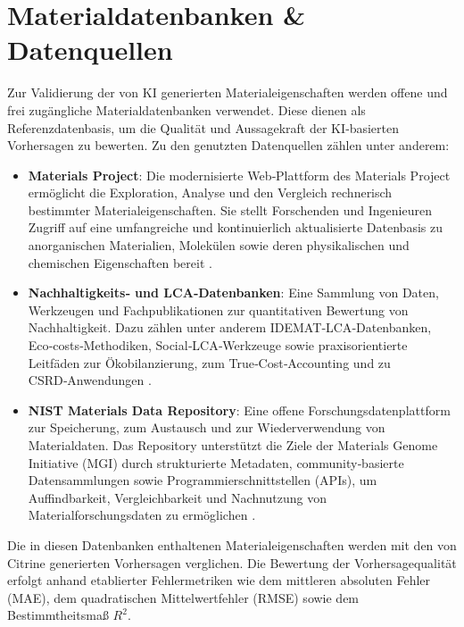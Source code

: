 \section{Materialdatenbanken \& Datenquellen} %

Zur Validierung der von KI generierten Materialeigenschaften werden offene und frei zugängliche Materialdatenbanken verwendet. Diese dienen als Referenzdatenbasis, um die Qualität und Aussagekraft der KI‑basierten Vorhersagen zu bewerten. Zu den genutzten Datenquellen zählen unter anderem:

\begin{itemize}
	\item \textbf{Materials Project}:  
	Die modernisierte Web‑Plattform des Materials Project ermöglicht die Exploration, Analyse und den Vergleich rechnerisch bestimmter Materialeigenschaften. Sie stellt Forschenden und Ingenieuren Zugriff auf eine umfangreiche und kontinuierlich aktualisierte Datenbasis zu anorganischen Materialien, Molekülen sowie deren physikalischen und chemischen Eigenschaften bereit \cite{materials_project_nextgen_2026}.
	
	\item \textbf{Nachhaltigkeits‑ und LCA‑Datenbanken}:  
	Eine Sammlung von Daten, Werkzeugen und Fachpublikationen zur quantitativen Bewertung von Nachhaltigkeit. Dazu zählen unter anderem IDEMAT‑LCA‑Datenbanken, Eco‑costs‑Methodiken, Social‑LCA‑Werkzeuge sowie praxisorientierte Leitfäden zur Ökobilanzierung, zum True‑Cost‑Accounting und zu CSRD‑Anwendungen \cite{ecocostsvalue_data_tools_books_2026}.
	
	\item \textbf{NIST Materials Data Repository}:  
	Eine offene Forschungsdatenplattform zur Speicherung, zum Austausch und zur Wiederverwendung von Materialdaten. Das Repository unterstützt die Ziele der Materials Genome Initiative (MGI) durch strukturierte Metadaten, community‑basierte Datensammlungen sowie Programmierschnittstellen (APIs), um Auffindbarkeit, Vergleichbarkeit und Nachnutzung von Materialforschungsdaten zu ermöglichen \cite{nist_materials_data_repository_2026}.
\end{itemize}

Die in diesen Datenbanken enthaltenen Materialeigenschaften werden mit den von Citrine generierten Vorhersagen verglichen. Die Bewertung der Vorhersagequalität erfolgt anhand etablierter Fehlermetriken wie dem mittleren absoluten Fehler (MAE), dem quadratischen Mittelwertfehler (RMSE) sowie dem Bestimmtheitsmaß \(R^2\).








